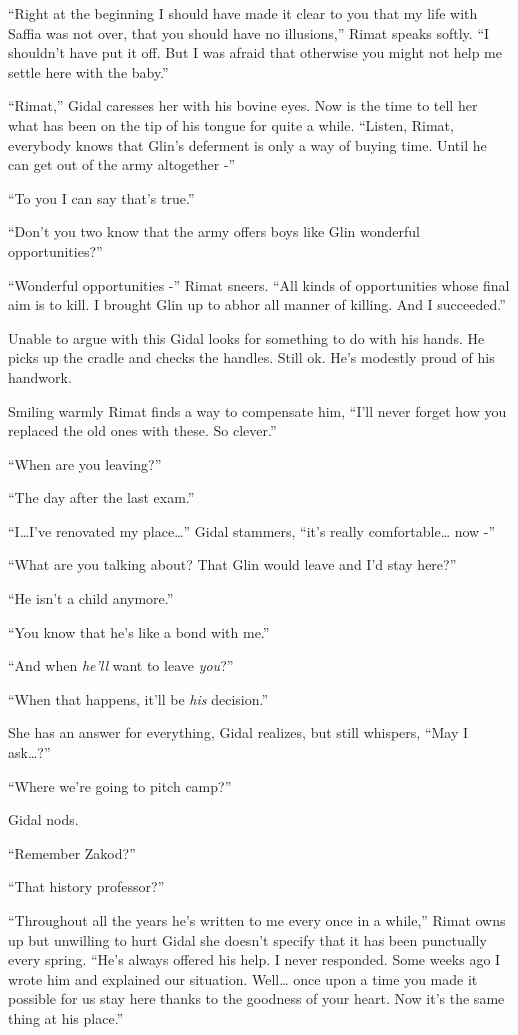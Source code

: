 \documentclass[twoside,11pt]{book}
\begin{document}
``Right at the beginning I should have made it clear to you that my life with Saffia was not over, that you
should have no illusions,'' Rimat speaks softly. ``I shouldn't have put it off. But I was afraid that otherwise you
might not help me settle here with the baby.''

``Rimat,'' Gidal caresses her with his bovine eyes. Now is the time to tell her what has been
on the tip of his tongue for quite a while. ``Listen, Rimat, everybody knows that Glin's
deferment is only a way of buying time. Until he can get out of the army altogether -''

``To you I can say that's true.''

``Don't you two know that the army offers boys like Glin wonderful opportunities?''

``Wonderful opportunities -'' Rimat sneers. ``All kinds of opportunities whose
final aim is to kill. I brought Glin up to abhor all manner of killing. And I succeeded.''

Unable to argue with this Gidal looks for something to do with his hands. He picks up the cradle and checks the handles.
Still ok. He's modestly proud of his handwork.

Smiling warmly Rimat finds a way to compensate him, ``I'll never forget how you replaced the old ones
with these. So clever.''

``When are you leaving?''

``The day after the last exam.''

``I{\dots}I've renovated my place{\dots}'' Gidal stammers, ``it's really
comfortable{\dots} now -''

``What are you talking about? That Glin would leave and I'd stay here?''

``He isn't a child anymore.''

``You know that he's like a bond with me.''

``And when \textit{he'll} want to leave \textit{you}?''

``When that happens, it'll be \textit{his} decision.''

She has an answer for everything, Gidal realizes, but still whispers, ``May I ask{\dots}?''

``Where we're going to pitch camp?''

Gidal nods.

``Remember Zakod?''

``That history professor?''

``Throughout all the years he's written to me every once in a while,'' Rimat owns up but
unwilling to hurt Gidal she doesn't specify that it has been
punctually every spring. ``He's always offered his help. I never
responded. Some weeks ago I wrote him and explained our situation. Well{\dots} once upon a time you made it possible
for us stay here thanks to the goodness of your heart. Now it's the same thing at his
place.''
\end{document}
